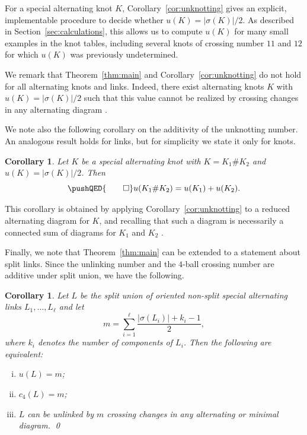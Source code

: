 \documentclass[a4paper,11pt]{amsart}
\newtheorem{cor}[thm]{Corollary}
\theoremstyle{definition}
\theoremstyle{remark}
\numberwithin{equation}{section}
\begin{document}
For a special alternating knot $K$, Corollary~\ref{cor:unknotting} gives an explicit, implementable procedure to decide whether $u(K)=|\sigma(K)|/2$. As described in Section~\ref{sec:calculations}, this allows us to compute $u(K)$ for many small examples in the knot tables, including several knots of crossing number $11$ and $12$ for which $u(K)$ was previously undetermined.

We remark that Theorem~\ref{thm:main} and Corollary~\ref{cor:unknotting} do not hold for all alternating knots and links. Indeed, there exist alternating knots $K$ with $u(K)=|\sigma(K)|/2$ such that this value cannot be realized by crossing changes in any alternating diagram \cite{Bleiler1984note, Bernhard1994unknotting}.


We note also the following corollary on the additivity of the unknotting number. An analogous result holds for links, but for simplicity we state it only for knots.
\begin{cor}\label{cor:additive}
Let $K$ be a special alternating knot with $K=K_1 \# K_2$ and $u(K)=|\sigma(K)|/2$. Then
\[\pushQED{\qed}
u(K_1 \# K_2)=u(K_1)+u(K_2). \qedhere
\]
\end{cor}
This corollary is obtained by applying Corollary~\ref{cor:unknotting} to a reduced alternating diagram for $K$, and recalling that such a diagram is necessarily a connected sum of diagrams for $K_1$ and $K_2$ \cite{Menasco1984incompressible}.

Finally, we note that Theorem~\ref{thm:main} can be extended to a statement about split links. Since the unlinking number and the $4$-ball crossing number are additive under split union, we have the following.

\begin{cor}\label{cor:split}
Let $L$ be the split union of oriented non-split special alternating links $L_1,\dots,L_\ell$ and let
\[
m=\sum_{i=1}^\ell \frac{|\sigma(L_i)|+k_i-1}{2},
\]
where $k_i$ denotes the number of components of $L_i$. Then the following are equivalent:
\begin{enumerate}[(i)]
\item\label{it:unlinking_split} $u(L)=m$;
\item\label{it:c4_split} $c_4(L)=m$;
\item\label{it:crossing_changes_split} $L$ can be unlinked by $m$ crossing changes in any alternating or minimal diagram. \qed
\end{enumerate} 
\end{cor}
\end{document}
